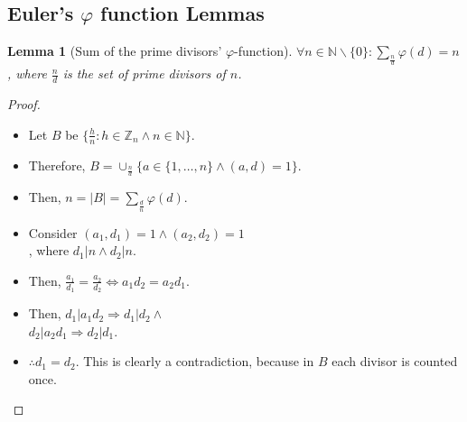 \documentclass[12pt, a4paper, english]{report}
\newtheorem{lemma}{Lemma}
\begin{document}
\subsection{Euler's $\varphi$ function Lemmas}
\begin{lemma}[Sum of the prime divisors' $\varphi$-function]
    $\forall n \in \mathbb{N} \backslash \{0\}: \sum_{\frac{n}{d}} \varphi(d) = n$, where $\frac{n}{d}$ is the set of prime divisors of $n$.\newline
\end{lemma}
\begin{proof}
    \begin{itemize}
        \item Let $B$ be $\{\frac{h}{n}: h \in \mathbb{Z}_{n} \land n \in \mathbb{N} \}$.
        \item Therefore, $B = \cup_{\frac{n}{d}}\{a \in \{1, \dots, n\} \land (a,d) = 1\}$.
        \item Then, $n = |B| = \sum_{\frac{d}{n}} \varphi(d)$.
        \item Consider $(a_{1}, d_{1}) = 1 \land (a_{2}, d_{2}) = 1$\\, where $d_{1}|n \land d_{2}|n$.
        \item Then, $\frac{a_{1}}{d_{1}} = \frac{a_{2}}{d_{2}} \iff a_{1}d_{2} = a_{2}d_{1}$.
        \item Then, $d_{1}|a_{1}d_{2} \Rightarrow d_{1}|d_{2} \land$\\
        $d_{2}|a_{2}d_{1} \Rightarrow d_{2}|d_{1}$.
        \item $\therefore d_{1} = d_{2}$. This is clearly a contradiction, because in $B$ each divisor is counted once.
    \end{itemize}
\end{proof}
\end{document}

